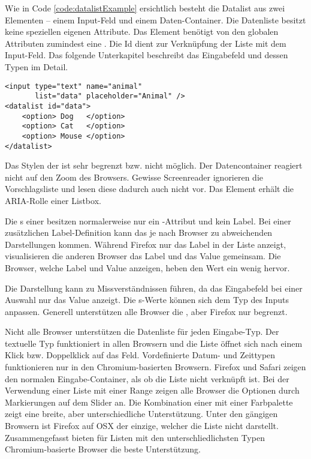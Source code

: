 Wie in Code \ref{code:datalistExample} ersichtlich besteht die Datalist aus zwei Elementen – einem Input-Feld und einem Daten-Container. 
Die Datenliste besitzt keine speziellen eigenen Attribute. 
Das Element benötigt von den globalen Attributen zumindest eine . 
Die Id dient zur Verknüpfung der Liste mit dem Input-Feld. 
Das folgende Unterkapitel \textbf{} beschreibt das Eingabefeld und dessen Typen im Detail. 

\begin{lstlisting}[style = htmlcssjs, caption = Datalist Beispiel, label = code:datalistExample]
<input type="text" name="animal" 
       list="data" placeholder="Animal" />
<datalist id="data">
    <option> Dog   </option>
    <option> Cat   </option>
    <option> Mouse </option>
</datalist>
\end{lstlisting}

Das Stylen der  ist sehr begrenzt bzw. nicht möglich. 
Der Datencontainer reagiert nicht auf den Zoom des Browsers. 
Gewisse Screenreader ignorieren die Vorschlagsliste und lesen diese dadurch auch nicht vor. 
Das Element erhält die ARIA-Rolle einer Listbox. 

Die s einer  besitzen normalerweise nur ein -Attribut und kein Label. 
Bei einer zusätzlichen Label-Definition kann das je nach Browser zu abweichenden Darstellungen kommen. 
Während Firefox nur das Label in der Liste anzeigt, visualisieren die anderen Browser das Label und das Value gemeinsam. 
Die Browser, welche Label und Value anzeigen, heben den Wert ein wenig hervor. 

Die Darstellung kann zu Missverständnissen führen, da das Eingabefeld bei einer Auswahl nur das Value anzeigt. 
Die s-Werte können sich dem Typ des Inputs anpassen. 
Generell unterstützen alle Browser die , aber Firefox nur begrenzt. 

Nicht alle Browser unterstützen die Datenliste für jeden Eingabe-Typ. 
Der textuelle Typ funktioniert in allen Browsern und die Liste öffnet sich nach einem Klick bzw. Doppelklick auf das Feld. 
Vordefinierte Datum- und Zeittypen funktionieren nur in den Chromium-basierten Browsern. 
Firefox und Safari zeigen den normalen Eingabe-Container, als ob die Liste nicht verknüpft ist. 
Bei der Verwendung einer Liste mit einer Range zeigen alle Browser die Optionen durch Markierungen auf dem Slider an. 
Die Kombination einer  mit einer Farbpalette zeigt eine breite, aber unterschiedliche Unterstützung. 
Unter den gängigen Browsern ist Firefox auf OSX der einzige, welcher die Liste nicht darstellt. 
Zusammengefasst bieten für Listen mit den unterschliedlichsten Typen Chromium-basierte Browser die beste Unterstützung. 


